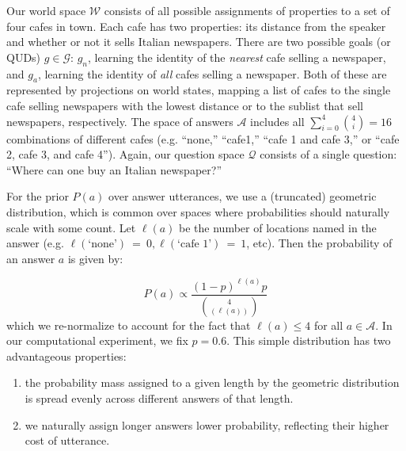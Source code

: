 \documentclass[12pt, floatsintext, jou]{apa6}
\begin{document}
Our world space $\mathcal{W}$ consists of all possible assignments of properties to a set of four cafes in town. Each cafe has two properties: its distance from the speaker and whether or not it sells Italian newspapers. There are two possible goals (or QUDs) $g \in \mathcal{G}$: $g_{n}$, learning the identity of the \emph{nearest} cafe selling a newspaper, and $g_{a}$, learning the identity of \emph{all} cafes selling a newspaper. Both of these are represented by projections on world states, mapping a list of cafes to the single cafe selling newspapers with the lowest distance or to the sublist that sell newspapers, respectively. The space of answers $\mathcal{A}$ includes all $\sum_{i=0}^4 {4 \choose i} = 16$ combinations of different cafes (e.g. ``none,'' ``cafe1,'' ``cafe 1 and cafe 3,'' or ``cafe 2, cafe 3, and cafe 4''). Again, our question space $\mathcal{Q}$ consists of a single question: ``Where can one buy an Italian newspaper?''

For the prior $P(a)$ over answer utterances, we use a (truncated) geometric distribution, which is common over spaces where probabilities should naturally scale with some count. Let $\ell(a)$ be the number of locations named in the answer (e.g. $\ell(\textrm{`none'})~=~0, \ell(\textrm{`cafe 1'})~=~1$, etc). Then the probability of an answer $a$ is given by:

$$P(a) \propto \frac{(1 - p)^{\ell(a)}p}{{4 \choose (\ell(a))}}$$
which we re-normalize to account for the fact that $\ell(a) \le 4$ for all $a\in \mathcal{A}$. In our computational experiment, we fix $p = 0.6$. 
This simple distribution has two advantageous properties: 
\begin{enumerate}[(1)]
\item the probability mass assigned to a given length by the geometric distribution is spread evenly across different answers of that length.
\item we naturally assign longer answers lower probability, reflecting their higher cost of utterance. \end{enumerate}
\end{document}
